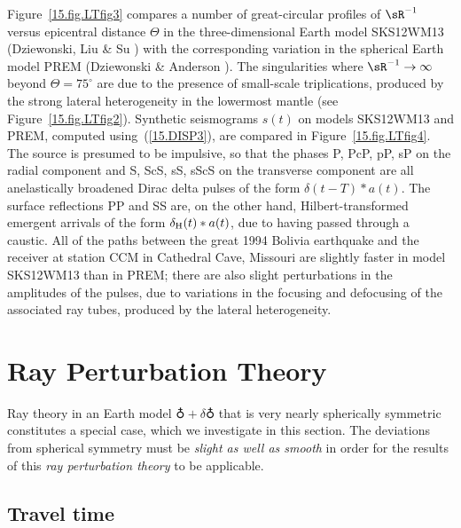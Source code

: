 Figure~\ref{15.fig.LTfig3} compares a number of great-circular profiles
of $\sR^{-1	}$ versus epicentral distance $\Theta$ in the
three-dimensional Earth model SKS12WM13 (Dziewonski, Liu \& Su
\citeyear{liu&dziewonski96}) with the corresponding variation
in the spherical Earth model PREM (Dziewonski \& Anderson
\citeyear{dziewonski&anderson81}).
The singularities where $\sR^{-1}\rightarrow\infty$ beyond
$\Theta=75^{\circ}$ are due to the presence of small-scale
triplications, produced by the strong lateral heterogeneity
in the lowermost mantle (see Figure~\ref{15.fig.LTfig2}).
Synthetic seismograms $s(t)$ on
models SKS12WM13 and PREM, computed using~(\ref{15.DISP3}),
are compared in Figure~\ref{15.fig.LTfig4}.  The source
is presumed to be impulsive, so that the phases
P, PcP, pP, sP on the radial component and S, ScS, sS,
sScS on the transverse component are all anelastically
broadened Dirac delta pulses of the form $\delta(t-T)*a(t)$.
The surface reflections PP and SS are, on the other hand,
Hilbert-transformed emergent arrivals of the form
$\delta_{\rm H}(t)*a(t)$, due to having passed
through a caustic.  All of the paths between the
%
great 1994 Bolivia earthquake and
the receiver
at station CCM in Cathedral Cave, Missouri are
slightly faster in model SKS12WM13 than in PREM;
there are also slight perturbations in the amplitudes of
the pulses, due to variations in the focusing and defocusing of
the associated ray tubes, produced by the lateral heterogeneity.

\section{Ray Perturbation Theory}
%
\label{section:15.9}

Ray theory in an Earth model $\earth+\delta\earth$
that is very nearly spherically symmetric constitutes
a special case, which we investigate in this section.
The deviations from spherical symmetry
must be {\em slight as well as smooth\/} in order for
%
%
the results of this {\em ray perturbation theory\/}
to be applicable.

\subsection{Travel time}

